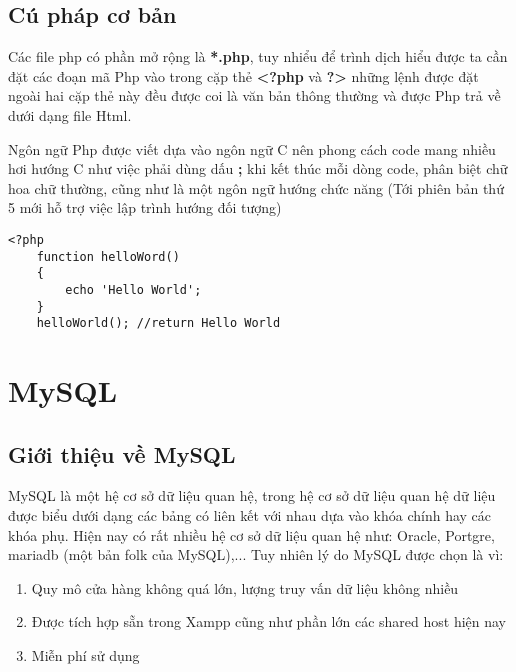 \subsection{Cú pháp cơ bản}
Các file php có phần mở rộng là \textbf{*.php}, tuy nhiểu để trình dịch hiểu được ta cần đặt các đoạn mã Php vào trong cặp thẻ \textbf{<?php} và \textbf{?>} những lệnh được đặt ngoài hai cặp thẻ này đều được coi là văn bản thông thường và được Php trả về dưới dạng file Html.\par
Ngôn ngữ Php được viết dựa vào ngôn ngữ C nên phong cách code mang nhiều hơi hướng C như việc phải dùng dấu \textbf{;} khi kết thúc mỗi dòng code, phân biệt chữ hoa chữ thường, cũng như là một ngôn ngữ hướng chức năng (Tới phiên bản thứ 5 mới hỗ trợ việc lập trình hướng đối tượng)
\lstset{language=Php}
\begin{center}
	\vspace{-2em}
	\begin{lstlisting}[frame=single]
<?php
    function helloWord()
    {
        echo 'Hello World';
    }
    helloWorld(); //return Hello World
\end{lstlisting}
\end{center}
\section{MySQL}
\subsection{Giới thiệu về MySQL}
MySQL là một hệ cơ sở dữ liệu quan hệ, trong hệ cơ sở dữ liệu quan hệ dữ liệu được biểu dưới dạng các bảng có liên kết với nhau dựa vào khóa chính hay các khóa phụ. Hiện nay có rất nhiều hệ cơ sở dữ liệu quan hệ như: Oracle, Portgre, mariadb (một bản folk của MySQL),... Tuy nhiên lý do MySQL được chọn là vì:
\begin{enumerate}
	\vspace{-1em}
	\itemsep0em
	\item Quy mô cửa hàng không quá lớn, lượng truy vấn dữ liệu không nhiều
	\item Được tích hợp sẵn trong Xampp cũng như phần lớn các shared host hiện nay
	\item Miễn phí sử dụng
\end{enumerate}

